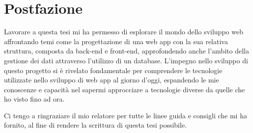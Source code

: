 \cleardoublepage
\renewcommand{\headrulewidth}{0pt}
\rhead{}
\thispagestyle{plain}
\begingroup
\let\clearpage\endgroup
\null{}

\chapter*{\centering Postfazione}
Lavorare a questa tesi mi ha permesso di esplorare il mondo dello sviluppo web affrontando temi come la progettazione di una web app con la sua relativa struttura, composta da back-end e front-end, approfondendo anche l'ambito della gestione dei dati attraverso l'utilizzo di un database.
L'impegno nello sviluppo di questo progetto si è rivelato fondamentale per comprendere le tecnologie utilizzate nello sviluppo di web app al giorno d'oggi, espandendo le mie conoscenze e capacità nel sapermi approcciare a tecnologie diverse da quelle che ho visto fino ad ora.

Ci tengo a ringraziare il mio relatore per tutte le linee guida e consigli che mi ha fornito, al fine di rendere la scrittura di questa tesi possibile.


 \null
\clearpage
\renewcommand{\headrulewidth}{0pt}
\thispagestyle{plain}
\rhead{}